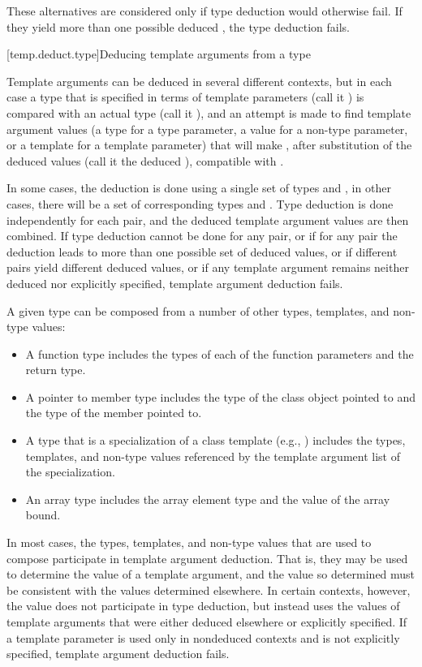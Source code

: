 These alternatives are considered only if type deduction would
otherwise fail.
If they yield more than one possible deduced
,
the type deduction fails.

[temp.deduct.type]{Deducing template arguments from a type}

\pnum
Template arguments can be deduced in several different contexts, but
in each case a type that is specified in terms of template parameters
(call it
)
is compared with an actual type (call it
),
and an attempt is made to find template argument values (a type for a type
parameter, a value for a non-type parameter, or a template for a
template parameter) that will make
,
after substitution of the deduced values (call it the deduced
),
compatible with
.

\pnum
In some cases, the deduction is done using a single set of types
and
,
in other cases, there will be a set of corresponding types
and
.
Type deduction is done
independently for each
pair, and the deduced template
argument values are then combined.
If type deduction cannot be done
for any
pair, or if for any pair the deduction leads to more than
one possible set of deduced values, or if different pairs yield
different deduced values, or if any template argument remains neither
deduced nor explicitly specified, template argument deduction fails.

\pnum
A given type
can be composed from a number of other
types, templates, and non-type values:

\begin{itemize}
\item
A function type includes the types of each of the function parameters
and the return type.
\item
A pointer to member type includes the type of the class object pointed to
and the type of the member pointed to.
\item
A type that is a specialization of a class template (e.g.,
)
includes the types, templates, and non-type values referenced by the
template argument list of the specialization.
\item
An array type includes the array element type and the value of the
array bound.
\end{itemize}

In most cases, the types, templates, and non-type values that are used
to compose
participate in template argument deduction.
That is,
they may be used to determine the value of a template argument, and
the value so determined must be consistent with the values determined
elsewhere.
In certain contexts, however, the value does not
participate in type deduction, but instead uses the values of template
arguments that were either deduced elsewhere or explicitly specified.
If a template parameter is used only in nondeduced contexts and is not
explicitly specified, template argument deduction fails.

